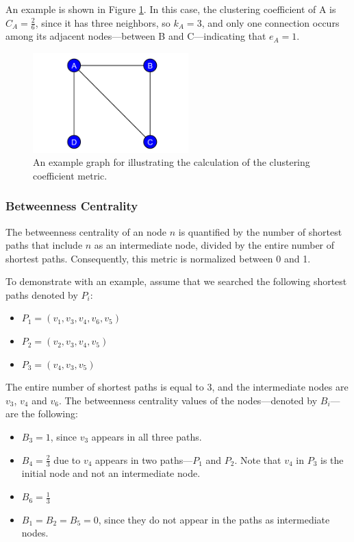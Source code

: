 An example is shown in Figure \ref{fig:clustering}. In this case, the clustering coefficient of \textsf{A} is $C_A = \frac{2}{6}$, since it has three neighbors, so $k_A = 3$, and only one connection occurs among its adjacent nodes---between \textsf{B} and \textsf{C}---indicating that $e_A = 1$.
\begin{figure}[!ht]
	\centering
	\includegraphics[width=60mm, keepaspectratio]{figures/clustering.pdf}
	\caption{An example graph for illustrating the calculation of the clustering coefficient metric.}
	\label{fig:clustering}
\end{figure}

\subsubsection{Betweenness Centrality}

The betweenness centrality of an node $n$ is quantified by the number of shortest paths that include $n$ as an intermediate node, divided by the entire number of shortest paths. Consequently, this metric is normalized between 0 and 1.

To demonstrate with an example, assume that we searched the following shortest paths denoted by $P_i$:
\begin{itemize}
	\item $P_1 = (v_1, v_3, v_4, v_6, v_5)$
	\item $P_2 = (v_2, v_3, v_4, v_5)$
	\item $P_3 = (v_4, v_3, v_5)$
\end{itemize}

The entire number of shortest paths is equal to 3, and the intermediate nodes are $v_3$, $v_4$ and $v_6$. The betweenness centrality values of the nodes---denoted by $B_i$---are the following:
\begin{itemize}
	\item $B_3 = 1$, since $v_3$ appears in all three paths.
	\item $B_4 = \frac{2}{3}$ due to $v_4$ appears in two paths---$P_1$ and $P_2$. Note that $v_4$ in $P_3$ is the initial node and not an intermediate node.
	\item $B_6 = \frac{1}{3}$
	\item $B_1 = B_2 = B_5 = 0$, since they do not appear in the paths as intermediate nodes.
\end{itemize}
